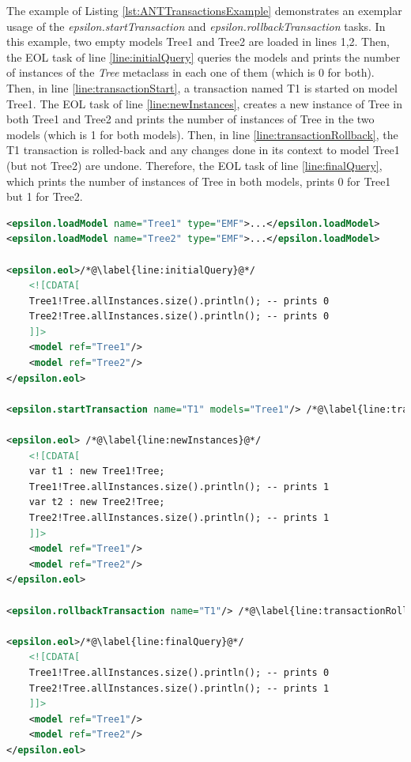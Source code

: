 The example of Listing \ref{lst:ANTTransactionsExample} demonstrates an exemplar usage of the \emph{epsilon.startTransaction} and \emph{epsilon.rollbackTransaction} tasks. In this example, two empty models Tree1 and Tree2 are loaded in lines 1,2. Then, the EOL task of line \ref{line:initialQuery} queries the models and prints the number of instances of the \emph{Tree} metaclass in each one of them (which is 0 for both). Then, in line \ref{line:transactionStart}, a transaction named T1 is started on model Tree1. The EOL task of line \ref{line:newInstances}, creates a new instance of Tree in both Tree1 and Tree2 and prints the number of instances of Tree in the two models (which is 1 for both models). Then, in line \ref{line:transactionRollback}, the T1 transaction is rolled-back and any changes done in its context to model Tree1 (but not Tree2) are undone. Therefore, the EOL task of line \ref{line:finalQuery}, which prints the number of instances of Tree in both models, prints 0 for Tree1 but 1 for Tree2.

\begin{lstlisting}[basicstyle=\ttfamily\footnotesize, flexiblecolumns=true, numbers=none, nolol=true, caption=Exemplar usage of the \emph{epsilon.startTransaction} and \emph{epsilon.rollbackTransaction} tasks, label=lst:ANTTransactionsExample, numbers=left, language=XML, tabsize=2]
<epsilon.loadModel name="Tree1" type="EMF">...</epsilon.loadModel>
<epsilon.loadModel name="Tree2" type="EMF">...</epsilon.loadModel>

<epsilon.eol>/*@\label{line:initialQuery}@*/
	<![CDATA[
	Tree1!Tree.allInstances.size().println(); -- prints 0 
	Tree2!Tree.allInstances.size().println(); -- prints 0
	]]>
	<model ref="Tree1"/>
	<model ref="Tree2"/>
</epsilon.eol>

<epsilon.startTransaction name="T1" models="Tree1"/> /*@\label{line:transactionStart}@*/

<epsilon.eol> /*@\label{line:newInstances}@*/
	<![CDATA[
	var t1 : new Tree1!Tree; 
	Tree1!Tree.allInstances.size().println(); -- prints 1
	var t2 : new Tree2!Tree;
	Tree2!Tree.allInstances.size().println(); -- prints 1
	]]>
	<model ref="Tree1"/>
	<model ref="Tree2"/>
</epsilon.eol>

<epsilon.rollbackTransaction name="T1"/> /*@\label{line:transactionRollback}@*/

<epsilon.eol>/*@\label{line:finalQuery}@*/
	<![CDATA[
	Tree1!Tree.allInstances.size().println(); -- prints 0 
	Tree2!Tree.allInstances.size().println(); -- prints 1 
	]]>
	<model ref="Tree1"/>
	<model ref="Tree2"/>
</epsilon.eol>
\end{lstlisting}

